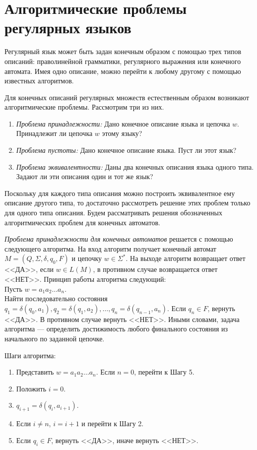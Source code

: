 \section{Алгоритмические проблемы регулярных языков}
\label{Chapter5AlgProblems}
Регулярный язык может быть задан конечным образом с помощью трех типов описаний: праволинейной грамматики, регулярного выражения или конечного автомата. Имея одно описание, можно перейти к любому другому с помощью известных алгоритмов.

Для конечных описаний регулярных множеств естественным образом возникают алгоритмические проблемы. Рассмотрим три из них.
\begin{enumerate}
\item \textit{Проблема принадлежности:} Дано конечное описание языка и цепочка $w$. Принадлежит ли цепочка $w$ этому языку?
\item \textit{Проблема пустоты:} Дано конечное описание языка. Пуст ли этот язык?
\item \textit{Проблема эквивалентности:} Даны два конечных описания языка одного типа. Задают ли эти описания один и тот же язык?
\end{enumerate}
Поскольку для каждого типа описания можно построить эквивалентное ему описание другого типа, то достаточно рассмотреть решение этих проблем только для одного типа описания. Будем рассматривать решения обозначенных алгоритмических проблем для конечных автоматов.

\textit{Проблема принадлежности для конечных автоматов} решается с помощью следующего алгоритма. На вход алгоритм получает конечный автомат $M = (Q,\Sigma, \delta, q_0, F)$ и цепочку $w \in \Sigma^*$. На выходе алгоритм возвращает ответ <<ДА>>, если $w \in L(M)$, в противном случае возвращается ответ <<НЕТ>>. Принцип работы алгоритма следующий:\\
Пусть $w = a_1a_2 \ldots a_n$. \\
Найти последовательно состояния $q_1 = \delta(q_0, a_1), q_2 = \delta(q_1, a_2), \ldots , q_n = \delta(q_{n-1}, a_n)$. Если $q_n \in F$, вернуть <<ДА>>. В противном случае вернуть <<НЕТ>>. Иными словами, задача алгоритма --- определить достижимость любого финального состояния из начального по заданной цепочке.

Шаги алгоритма:
\begin{enumerate}
\item  Представить $w = a_1a_2 \ldots a_n$. Если $n = 0$, перейти к Шагу 5.
\item Положить $i = 0$.
\item $q_{i+1} = \delta(q_i, a_{i+1})$.
\item Если $ i \neq n$, $ i = i + 1$ и перейти к Шагу 2.
\item Если $q_i \in F$, вернуть <<ДА>>, иначе вернуть <<НЕТ>>.
\end{enumerate}

